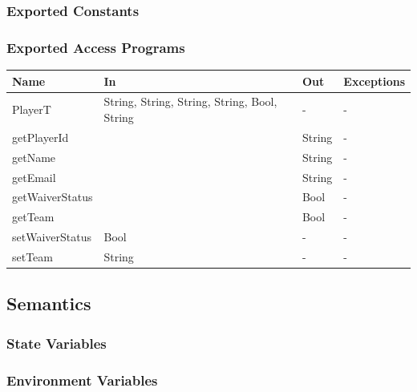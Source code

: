 \documentclass[12pt, titlepage]{article}
\begin{document}
\subsubsection{Exported Constants}

\subsubsection{Exported Access Programs}

\begin{center}
  \begin{tabular}{|p{4cm}| p{4cm}| p{4cm} | p{3cm}|}
    \hline
    \textbf{Name}   & \textbf{In}                                  & \textbf{Out} & \textbf{Exceptions} \\
    \hline
    PlayerT         & String, String, String, String, Bool, String & -            & -                   \\
    getPlayerId     &                                              & String       & -                   \\
    getName         &                                              & String       & -                   \\
    getEmail        &                                              & String       & -                   \\
    getWaiverStatus &                                              & Bool         & -                   \\
    getTeam         &                                              & Bool         & -                   \\
    setWaiverStatus & Bool                                         & -            & -                   \\
    setTeam         & String                                       & -            & -                   \\
    \hline
  \end{tabular}
\end{center}

\subsection{Semantics}

\subsubsection{State Variables}

\subsubsection{Environment Variables}
\end{document}
